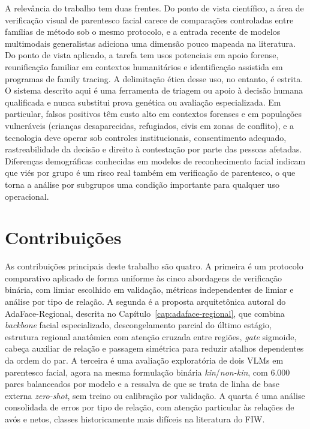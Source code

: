 A relevância do trabalho tem duas frentes. Do ponto de vista científico, a área de verificação visual de parentesco facial carece de comparações controladas entre famílias de método sob o mesmo protocolo, e a entrada recente de modelos multimodais generalistas adiciona uma dimensão pouco mapeada na literatura. Do ponto de vista aplicado, a tarefa tem usos potenciais em apoio forense, reunificação familiar em contextos humanitários e identificação assistida em programas de family tracing. A delimitação ética desse uso, no entanto, é estrita. O sistema descrito aqui é uma ferramenta de triagem ou apoio à decisão humana qualificada e nunca substitui prova genética ou avaliação especializada. Em particular, falsos positivos têm custo alto em contextos forenses e em populações vulneráveis (crianças desaparecidas, refugiados, civis em zonas de conflito), e a tecnologia deve operar sob controles institucionais, consentimento adequado, rastreabilidade da decisão e direito à contestação por parte das pessoas afetadas. Diferenças demográficas conhecidas em modelos de reconhecimento facial \cite{buolamwini2018gender} indicam que viés por grupo é um risco real também em verificação de parentesco, o que torna a análise por subgrupos uma condição importante para qualquer uso operacional.

\section{Contribuições}

As contribuições principais deste trabalho são quatro. A primeira é um protocolo comparativo aplicado de forma uniforme às cinco abordagens de verificação binária, com limiar escolhido em validação, métricas independentes de limiar e análise por tipo de relação. A segunda é a proposta arquitetônica autoral do AdaFace-Regional, descrita no Capítulo~\ref{cap:adaface-regional}, que combina \textit{backbone} facial especializado, descongelamento parcial do último estágio, estrutura regional anatômica com atenção cruzada entre regiões, \textit{gate} sigmoide, cabeça auxiliar de relação e passagem simétrica para reduzir atalhos dependentes da ordem do par. A terceira é uma avaliação exploratória de dois VLMs em parentesco facial, agora na mesma formulação binária \textit{kin}/\textit{non-kin}, com 6.000 pares balanceados por modelo e a ressalva de que se trata de linha de base externa \textit{zero-shot}, sem treino ou calibração por validação. A quarta é uma análise consolidada de erros por tipo de relação, com atenção particular às relações de avós e netos, classes historicamente mais difíceis na literatura do FIW.

